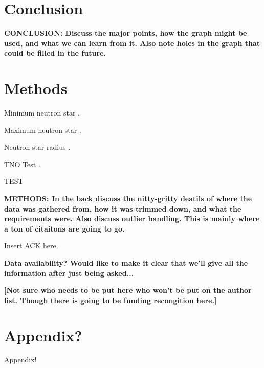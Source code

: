 \documentclass[twocolumn,linenumbers]{aastex631}
\begin{document}
\section{Conclusion} \label{sec:intro}

\textbf{\color{blue}CONCLUSION: Discuss the major points, how the graph might be used, and what we can learn from it. Also note holes in the graph that could be filled in the future. \color{black}}

\section{Methods} \label{sec:methods}

Minimum neutron star \citep{Suwa2018}. 

Maximum neutron star \citep{Romani2022}. 

Neutron star radius \citep{Ozel2016}. 

TNO Test \citep{Brown2017}. 

TEST \citep{Morin2010}

\textbf{\color{blue}METHODS: In the back discuss the nitty-gritty deatils of where the data was gathered from, how it was trimmed down, and what the requirements were. Also discuss outlier handling. This is mainly where a ton of citaitons are going to go. \color{black}}

\begin{acknowledgments}
Insert ACK here. 

\textbf{\color{blue}Data availability? Would like to make it clear that we'll give all the information after just being asked...\color{black}}

\textbf{\color{red}[Not sure who needs to be put here who won't be put on the author list. Though there is going to be funding recongition here.]\color{black}}
\end{acknowledgments}

\appendix

\section{Appendix?}

Appendix!

{}

\end{document}
